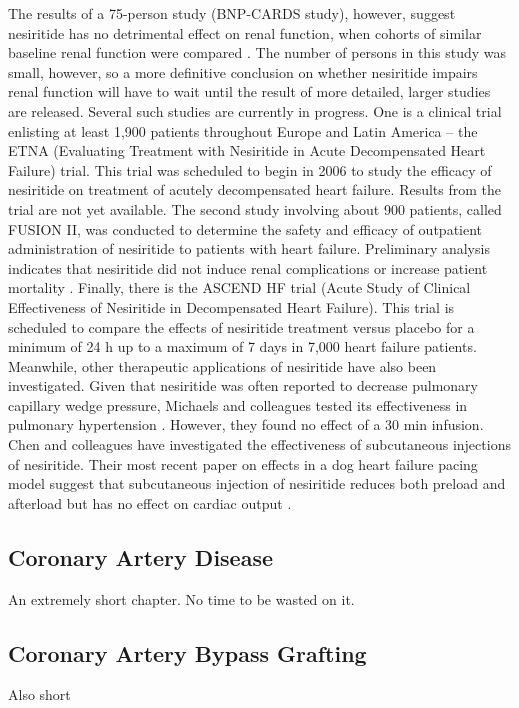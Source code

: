 \documentclass[14pt,a4paper,onecolumn]{article}
\begin{document}
The results of a 75-person study (BNP-CARDS study), however, suggest nesiritide has no detrimental effect on renal function, when cohorts of similar baseline renal function were compared \citep{Witteles2007}. The number of persons in this study was small, however, so a more definitive conclusion on whether nesiritide impairs renal function will have to wait until the result of more detailed, larger studies are released. Several such studies are currently in progress. One is a clinical trial enlisting at least 1,900 patients throughout Europe and Latin America – the ETNA (Evaluating Treatment with Nesiritide in Acute Decompensated Heart Failure) trial.
This trial was scheduled to begin in 2006 to study the efficacy of nesiritide on treatment of acutely decompensated heart failure. Results from the trial are not yet available. The second study involving about 900 patients, called FUSION II, was conducted to determine the safety and efficacy of outpatient administration of nesiritide to patients with heart failure. Preliminary analysis indicates that nesiritide did not induce renal complications or increase patient mortality \citep{Cleland2007}.
Finally, there is the ASCEND HF trial (Acute Study of Clinical Effectiveness of Nesiritide in Decompensated Heart Failure). This trial is scheduled to compare the effects of nesiritide treatment versus placebo for a minimum of 24 h up to a maximum of 7 days in 7,000 heart failure patients. Meanwhile, other therapeutic applications of nesiritide have also been investigated. Given that nesiritide was often reported to decrease pulmonary capillary wedge pressure, Michaels and colleagues tested its effectiveness in pulmonary hypertension \citep{Michaels2005}.
However, they found no effect of a 30 min infusion. Chen and colleagues have investigated the effectiveness of subcutaneous injections of nesiritide. Their most recent paper on effects in a dog heart failure pacing model suggest that subcutaneous injection of nesiritide reduces both preload and afterload but has no effect on cardiac output \citep{Chen2006}.

\subsection{Coronary Artery Disease}
An extremely short chapter.  No time to be wasted on it.

\subsection{Coronary Artery Bypass Grafting}
Also short
\end{document}
